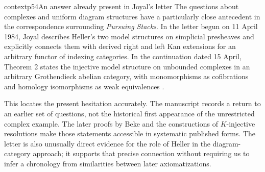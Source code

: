 \begin{dcomment}{context}{p54}{An answer already present in Joyal's letter}
The questions about complexes and uniform diagram structures have a particularly close antecedent in the correspondence surrounding \emph{Pursuing Stacks}. In the letter begun on 11 April 1984, Joyal describes Heller's two model structures on simplicial presheaves and explicitly connects them with derived right and left Kan extensions for an arbitrary functor of indexing categories. In the continuation dated 15 April, Theorem 2 states the injective model structure on unbounded complexes in an arbitrary Grothendieck abelian category, with monomorphisms as cofibrations and homology isomorphisms as weak equivalences \citep[pp.~3 and 10]{Joyal1984Letter}.

This locates the present hesitation accurately. The manuscript records a return to an earlier set of questions, not the historical first appearance of the unrestricted complex example. The later proofs by Beke and the constructions of $K$-injective resolutions make those statements accessible in systematic published forms. The letter is also unusually direct evidence for the role of Heller in the diagram-category approach; it supports that precise connection without requiring us to infer a chronology from similarities between later axiomatizations.
\end{dcomment}

